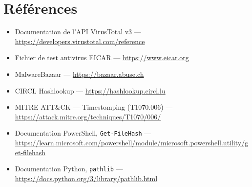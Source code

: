 \documentclass[12pt,a4paper]{article}
\begin{document}
\newpage
\section*{Références}
\small
\sloppy

\begin{itemize}[itemsep=6pt]
  \item Documentation de l'API VirusTotal v3 — \url{https://developers.virustotal.com/reference}
  \item Fichier de test antivirus EICAR — \url{https://www.eicar.org}
  \item MalwareBazaar — \url{https://bazaar.abuse.ch}
  \item CIRCL Hashlookup — \url{https://hashlookup.circl.lu}
  \item MITRE ATT\&CK — Timestomping (T1070.006) — \url{https://attack.mitre.org/techniques/T1070/006/}
  \item Documentation PowerShell, \texttt{Get-FileHash} — \url{https://learn.microsoft.com/powershell/module/microsoft.powershell.utility/get-filehash}
  \item Documentation Python, \texttt{pathlib} — \url{https://docs.python.org/3/library/pathlib.html}
\end{itemize}
\normalsize
\fussy
\end{document}
